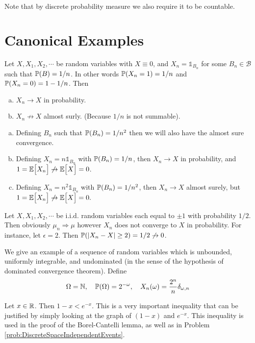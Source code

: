 \begin{remark}
	Note that by discrete probability measure we also require it to be countable.
\end{remark}

\newpage

\section{Canonical Examples}
\begin{example}
	Let $ X, X_1,X_2,\cdots $ be random variables with $ X\equiv 0 $, and $ X_n = \mathds{1}_{B_n} $ for some $ B_n \in \mathcal{B} $ such that $ \mathbb{P}(B)=1/n $. In other words $ \mathbb{P}(X_n = 1) = 1/n $ and $ \mathbb{P}(X_n=0) = 1-1/n $. Then 
	\begin{enumerate}[(a)]
		\item $ X_n \to X $ in probability.
		\item $ X_n \not\to X $ almost surly. (Because $ 1/n $ is not summable). 
	\end{enumerate}
\end{example}
\begin{remark}
	\begin{enumerate}[(a)]
		\item Defining $ B_n $ such that $ \mathbb{P}(B_n) =1/n^2 $ then we will also have the almost sure convergence.
		\item Defining $ X_n = n\mathds{1}_{B_n} $ with $ \mathbb{P}(B_n)=1/n $, then $ X_n\to X $ in probability, and $ 1 = \mathbb{E}\big[X_n\big] \not\to \mathbb{E}\big[X\big] = 0 $.
		\item Defining $ X_n = n^2\mathds{1}_{B_n} $ with $ \mathbb{P}(B_n)=1/n^2 $, then $ X_n\to X $ almost surely, but $ 1 = \mathbb{E}\big[X_n\big] \not\to \mathbb{E}\big[X\big] = 0. $
	\end{enumerate}
\end{remark}


\begin{example}
	Let $ X,X_1,X_2,\cdots $ be i.i.d. random variables each equal to $ \pm 1 $ with probability $ 1/2 $. Then obviously $ \mu_n \Rightarrow \mu $ however $ X_n $ does not converge to $ X $ in probability. For instance, let $ \epsilon=2 $. Then $ \mathbb{P}(|X_n-X|\geq 2) = 1/2 \not\to 0 $.
\end{example}


\begin{example}
	We give an example of a sequence of random variables which is unbounded, uniformly integrable, and undominated (in the sense of the hypothesis of dominated convergence theorem). Define
	\[ \Omega = \mathbb{N},\quad \mathbb{P}(\Omega)=2^{-\omega},\quad X_n(\omega) = \frac{2^n}{n}\delta_{\omega,n} \]
\end{example}


\begin{observation}
	Let $ x\in \mathbb{R} $. Then $ 1-x < e^{-x} $. This is a very important inequality that can be justified by simply looking at the graph of $ (1-x) $ and $ e^{-x} $. This inequality is used in the proof of the Borel-Cantelli lemma, as well as in Problem \autoref{prob:DiscreteSpaceIndependentEvents}.
\end{observation}